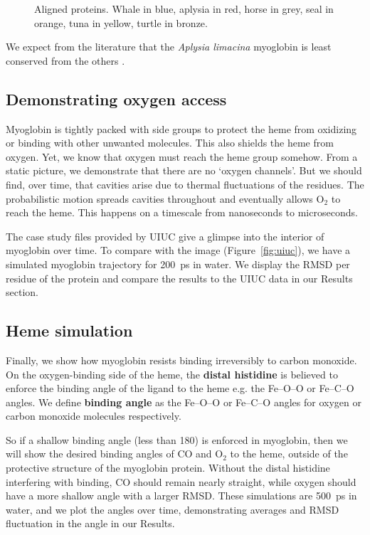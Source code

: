 \documentclass{article}
\begin{document}
\begin{figure}
\begin{minipage}{0.5\textwidth}
    \caption{Aligned proteins. Whale in blue, aplysia in red, horse in grey, seal in orange, tuna in yellow, turtle in bronze.}
    \label{fig:multiseq}
  \end{minipage}
\end{figure}

We expect from the literature that the \textit{Aplysia limacina} myoglobin is least conserved from the others \cite{tutorial}.

\subsection{Demonstrating oxygen access}

Myoglobin is tightly packed with side groups to protect the heme from oxidizing or binding with other unwanted molecules.  This also shields the heme from oxygen.  Yet, we know that oxygen must reach the heme group somehow.  From a static picture, we demonstrate that there are no `oxygen channels'.  But we should find, over time, that cavities arise due to thermal fluctuations of the residues.  The probabilistic motion spreads cavities throughout and eventually allows O$_2$ to reach the heme.  This happens on a timescale from nanoseconds to microseconds.

The case study files provided by UIUC \cite{tutorial} give a glimpse into the interior of myoglobin over time.  To compare with the image (Figure~\ref{fig:uiuc}), we have a simulated myoglobin trajectory for \SI{200}{\pico\second} in water.  We display the RMSD per residue of the protein and compare the results to the UIUC data in our Results section.

\subsection{Heme simulation}

Finally, we show how myoglobin resists binding irreversibly to carbon monoxide.  On the oxygen-binding side of the heme, the \textbf{distal histidine} is believed to enforce the binding angle of the ligand to the heme e.g. the Fe--O--O or Fe--C--O angles.  We define \textbf{binding angle} as the Fe--O--O or Fe--C--O angles for oxygen or carbon monoxide molecules respectively.



So if a shallow binding angle (less than 180\textdegree) is enforced in myoglobin, then we will show the desired binding angles of CO and O$_2$ to the heme, outside of the protective structure of the myoglobin protein.  Without the distal histidine interfering with binding, CO should remain nearly straight, while oxygen should have a more shallow angle with a larger RMSD.  These simulations are \SI{500}{\pico\second} in water, and we plot the angles over time, demonstrating averages and RMSD fluctuation in the angle in our Results.
\end{document}
